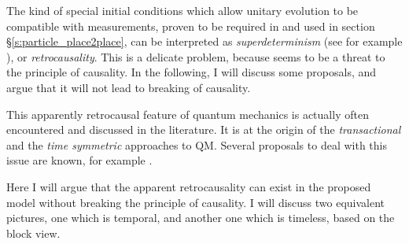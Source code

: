 \documentclass[11pt]{amsart}
\theoremstyle{definition}
\theoremstyle{plain}
\begin{document}
The kind of special initial conditions which allow unitary evolution to be compatible with measurements, proven to be required in \cite{Sto12QMb} and used in section \S\ref{s:particle_place2place}, can be interpreted as \emph{superdeterminism} (see for example \cite{hooft2011wave}), or \emph{retrocausality}. This is a delicate problem, because seems to be a threat to the principle of causality. In the following, I will discuss some proposals, and argue that it will not lead to breaking of causality.

This apparently retrocausal feature of quantum mechanics is actually often encountered and discussed in the literature. It is at the origin of the \emph{transactional} \cite{cramer1986transactional,cramer1988overview} and the \emph{time symmetric} \cite{aharonov1964time,aharonov1988result,aharonov1991complete,aharonov2007newinsights,aharonov2007TSV} approaches to QM. Several proposals to deal with this issue are known, for example \cite{deBeauregard1953-DEBMQ,Rietdijk1978retroactiveInfluence,price2008toyRetrocausality,price2015disentangling}.

Here I will argue that the apparent retrocausality can exist in the proposed model without breaking the principle of causality. I will discuss two equivalent pictures, one which is temporal, and another one which is timeless, based on the block view.
\end{document}
